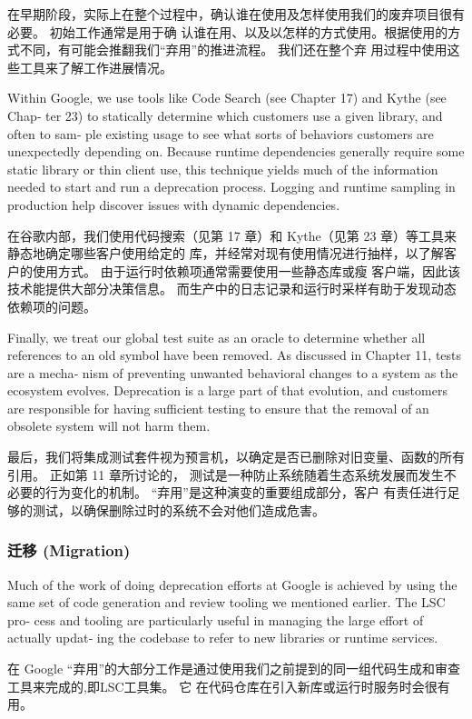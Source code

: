\documentclass[10pt,a4paper,UTF8]{ctexart}
\begin{document}
在早期阶段，实际上在整个过程中，确认谁在使用及怎样使用我们的废弃项目很有必要。 初始工作通常是用于确
认谁在用、以及以怎样的方式使用。根据使用的方式不同，有可能会推翻我们“弃用”的推进流程。 我们还在整个弃
用过程中使用这些工具来了解工作进展情况。

Within Google, we use tools like Code Search (see Chapter 17) and Kythe (see Chap‐ ter 23) to
statically determine which customers use a given library, and often to sam‐ ple existing usage to
see what sorts of behaviors customers are unexpectedly depending on. Because runtime dependencies
generally require some static library or thin client use, this technique yields much of the
information needed to start and run a deprecation process. Logging and runtime sampling in
production help discover issues with dynamic dependencies.

在谷歌内部，我们使用代码搜索（见第 17 章）和 Kythe（见第 23 章）等工具来静态地确定哪些客户使用给定的
库，并经常对现有使用情况进行抽样，以了解客户的使用方式。 由于运行时依赖项通常需要使用一些静态库或瘦
客户端，因此该技术能提供大部分决策信息。 而生产中的日志记录和运行时采样有助于发现动态依赖项的问题。

Finally, we treat our global test suite as an oracle to determine whether all references to an old
symbol have been removed. As discussed in Chapter 11, tests are a mecha‐ nism of preventing unwanted
behavioral changes to a system as the ecosystem evolves. Deprecation is a large part of that
evolution, and customers are responsible for having sufficient testing to ensure that the removal of
an obsolete system will not harm them.

最后，我们将集成测试套件视为预言机，以确定是否已删除对旧变量、函数的所有引用。 正如第 11 章所讨论的，
测试是一种防止系统随着生态系统发展而发生不必要的行为变化的机制。 “弃用”是这种演变的重要组成部分，客户
有责任进行足够的测试，以确保删除过时的系统不会对他们造成危害。

\subsubsection{迁移 (Migration)}
\label{sec:org42b39a5}

Much of the work of doing deprecation efforts at Google is achieved by using the same set of code
generation and review tooling we mentioned earlier. The LSC pro‐ cess and tooling are particularly
useful in managing the large effort of actually updat‐ ing the codebase to refer to new libraries or
runtime services.

在 Google “弃用”的大部分工作是通过使用我们之前提到的同一组代码生成和审查工具来完成的,即LSC工具集。 它
在代码仓库在引入新库或运行时服务时会很有用。
\end{document}
